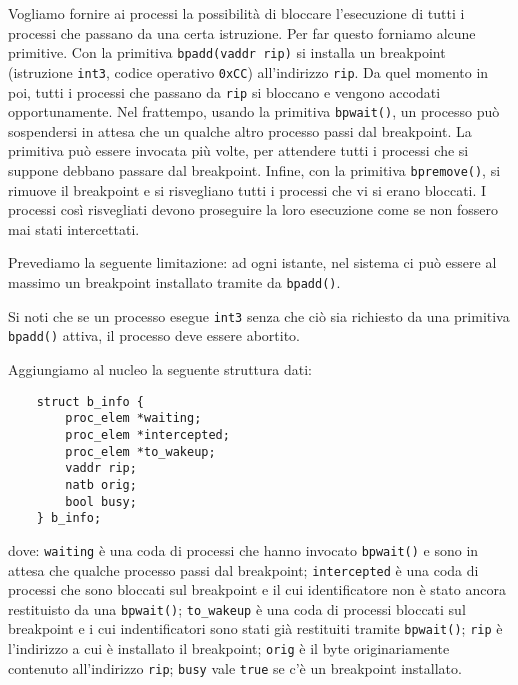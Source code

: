 Vogliamo fornire ai processi la possibilit\`a di bloccare l'esecuzione di tutti i processi che passano da una certa istruzione.
Per far questo forniamo alcune primitive. Con la primitiva \verb|bpadd(vaddr rip)| si installa un breakpoint (istruzione \verb|int3|, codice operativo \verb|0xCC|) 
all'indirizzo \verb|rip|. Da quel momento in poi, tutti i processi che passano da \verb|rip| si bloccano e vengono accodati opportunamente.
Nel frattempo, usando la primitiva \verb|bpwait()|, un processo pu\`o sospendersi in attesa che un qualche altro processo passi dal breakpoint.
La primitiva pu\`o essere invocata pi\`u volte, per attendere tutti i processi che si suppone debbano passare dal breakpoint.
Infine, con la primitiva \verb|bpremove()|, si rimuove il breakpoint e si risvegliano tutti i processi che vi si erano bloccati. I processi
cos\`i risvegliati devono proseguire la loro esecuzione come se non fossero mai stati intercettati.

Prevediamo la seguente limitazione: ad ogni istante, nel sistema ci pu\`o essere al massimo un breakpoint installato tramite da \verb|bpadd()|.

Si noti che se un processo esegue \verb|int3| senza che ci\`o sia richiesto da una primitiva \verb|bpadd()| attiva, il processo
deve essere abortito.

Aggiungiamo al nucleo la seguente struttura dati:
\begin{verbatim}
    struct b_info {
        proc_elem *waiting;
        proc_elem *intercepted;
        proc_elem *to_wakeup;
        vaddr rip;
        natb orig;
        bool busy;
    } b_info;
\end{verbatim}
dove: \verb|waiting| \`e una coda di processi che hanno invocato \verb|bpwait()| e sono in attesa che qualche processo passi dal breakpoint;
\verb|intercepted| \`e una coda di processi che sono bloccati sul breakpoint e il cui identificatore non \`e stato ancora restituisto
da una \verb|bpwait()|; \verb|to_wakeup| \`e una coda di processi bloccati sul breakpoint e i cui indentificatori sono stati gi\`a
restituiti tramite \verb|bpwait()|; \verb|rip| \`e l'indirizzo a cui \`e installato il breakpoint; \verb|orig| \`e il byte
originariamente contenuto all'indirizzo \verb|rip|; \verb|busy| vale \verb|true| se c'\`e un breakpoint installato.

